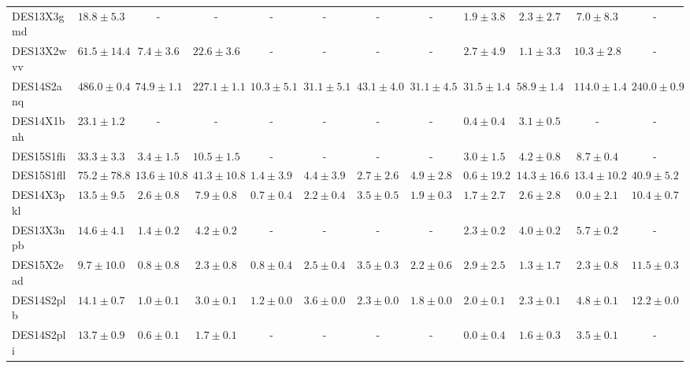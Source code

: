 \documentclass[fleqn,usenatbib,]{mnras}
\begin{document}
\begin{table}
\begin{tabular}{lccccccccccc}
DES13X3gmd &   $18.8 \pm 5.3$ &                - &                 - &               - &               - &               - &               - &   $1.9 \pm 3.8$ &    $2.3 \pm 2.7$ &    $7.0 \pm 8.3$ &                - \\
DES13X2wvv &  $61.5 \pm 14.4$ &    $7.4 \pm 3.6$ &    $22.6 \pm 3.6$ &               - &               - &               - &               - &   $2.7 \pm 4.9$ &    $1.1 \pm 3.3$ &   $10.3 \pm 2.8$ &                - \\
DES14S2anq &  $486.0 \pm 0.4$ &   $74.9 \pm 1.1$ &   $227.1 \pm 1.1$ &  $10.3 \pm 5.1$ &  $31.1 \pm 5.1$ &  $43.1 \pm 4.0$ &  $31.1 \pm 4.5$ &  $31.5 \pm 1.4$ &   $58.9 \pm 1.4$ &  $114.0 \pm 1.4$ &  $240.0 \pm 0.9$ \\
DES14X1bnh &   $23.1 \pm 1.2$ &                - &                 - &               - &               - &               - &               - &   $0.4 \pm 0.4$ &    $3.1 \pm 0.5$ &                - &                - \\
DES15S1fli &   $33.3 \pm 3.3$ &    $3.4 \pm 1.5$ &    $10.5 \pm 1.5$ &               - &               - &               - &               - &   $3.0 \pm 1.5$ &    $4.2 \pm 0.8$ &    $8.7 \pm 0.4$ &                - \\
DES15S1fll &  $75.2 \pm 78.8$ &  $13.6 \pm 10.8$ &   $41.3 \pm 10.8$ &   $1.4 \pm 3.9$ &   $4.4 \pm 3.9$ &   $2.7 \pm 2.6$ &   $4.9 \pm 2.8$ &  $0.6 \pm 19.2$ &  $14.3 \pm 16.6$ &  $13.4 \pm 10.2$ &   $40.9 \pm 5.2$ \\
DES14X3pkl &   $13.5 \pm 9.5$ &    $2.6 \pm 0.8$ &     $7.9 \pm 0.8$ &   $0.7 \pm 0.4$ &   $2.2 \pm 0.4$ &   $3.5 \pm 0.5$ &   $1.9 \pm 0.3$ &   $1.7 \pm 2.7$ &    $2.6 \pm 2.8$ &    $0.0 \pm 2.1$ &   $10.4 \pm 0.7$ \\
DES13X3npb &   $14.6 \pm 4.1$ &    $1.4 \pm 0.2$ &     $4.2 \pm 0.2$ &               - &               - &               - &               - &   $2.3 \pm 0.2$ &    $4.0 \pm 0.2$ &    $5.7 \pm 0.2$ &                - \\
DES15X2ead &   $9.7 \pm 10.0$ &    $0.8 \pm 0.8$ &     $2.3 \pm 0.8$ &   $0.8 \pm 0.4$ &   $2.5 \pm 0.4$ &   $3.5 \pm 0.3$ &   $2.2 \pm 0.6$ &   $2.9 \pm 2.5$ &    $1.3 \pm 1.7$ &    $2.3 \pm 0.8$ &   $11.5 \pm 0.3$ \\
DES14S2plb &   $14.1 \pm 0.7$ &    $1.0 \pm 0.1$ &     $3.0 \pm 0.1$ &   $1.2 \pm 0.0$ &   $3.6 \pm 0.0$ &   $2.3 \pm 0.0$ &   $1.8 \pm 0.0$ &   $2.0 \pm 0.1$ &    $2.3 \pm 0.1$ &    $4.8 \pm 0.1$ &   $12.2 \pm 0.0$ \\
DES14S2pli &   $13.7 \pm 0.9$ &    $0.6 \pm 0.1$ &     $1.7 \pm 0.1$ &               - &               - &               - &               - &   $0.0 \pm 0.4$ &    $1.6 \pm 0.3$ &    $3.5 \pm 0.1$ &                - \\

\end{tabular}
\end{table}
\end{document}
